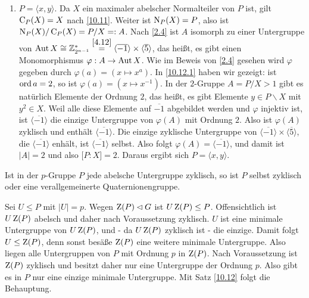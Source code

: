 \begin{beweis}
\begin{enumerate}
\item $P=\langle x, y\rangle$. Da $X$ ein maximaler abelscher Normalteiler von $P$ ist, gilt $\operatorname{C}_P(X)=X$ nach \ref{10.11}. Weiter ist $\operatorname{N}_P(X)=P$, also ist $\operatorname{N}_P(X)/\operatorname{C}_P(X)=P/X=:A$. Nach \ref{2.4} ist $A$ isomorph zu einer Untergruppe von $\operatorname{Aut} X\cong \mathbb{Z}_{2^{n-1}}^*\stackrel{\ref{4.12}}{=}\langle \overline{-1} \rangle\times\langle \overline{5}\rangle$, das hei\ss{}t, es gibt einen Monomorphismus $\varphi:A\to \operatorname{Aut} X$. Wie im Beweis von \ref{2.4} gesehen wird $\varphi$ gegeben durch $\varphi(a)=(x\longmapsto x^a)$. In \ref{10.12.1} haben wir gezeigt: ist $\operatorname{ord} a=2$, so ist $\varphi(a)=(x\longmapsto x^{-1})$. In der $2$-Gruppe $A=P/X>1$ gibt es nat\"urlich Elemente der Ordnung $2$, das hei\ss{}t, es gibt Elemente $y\in P\backslash X$ mit $y^2\in X$. Weil alle diese Elemente auf $\overline{-1}$ abgebildet werden und $\varphi$ injektiv ist, ist $\langle \overline{-1}\rangle$ die einzige Untergruppe von $\varphi(A)$ mit Ordnung $2$. Also ist $\varphi(A)$ zyklisch und enth\"alt $\langle \overline{-1}\rangle$. Die einzige zyklische Untergruppe von $\langle\overline{-1}\rangle\times\langle \overline{5} \rangle$, die $\langle\overline{-1}\rangle$ enh\"alt, ist $\langle \overline{-1}\rangle$ selbst. Also folgt $\varphi(A)=\langle\overline{-1}\rangle$, und damit ist $|A|=2$ und also $\lbrack P:X\rbrack=2$. Daraus ergibt sich $P=\langle x,y\rangle$.
\end{enumerate}

 
\end{beweis}


\begin{folgerung}\label{10.13}
 Ist in der $p$-Gruppe $P$ jede abelsche Untergruppe zyklisch, so ist $P$ selbst zyklisch oder eine verallgemeinerte Quaternionengruppe.
\end{folgerung}
\begin{beweis}
Sei $U\leq P$ mit $|U|=p$. Wegen $\operatorname{Z}(P)\lhd G$ ist $U\operatorname{Z}(P)\leq P$. Offensichtlich ist $U\operatorname{Z}(P)$ abelsch und daher nach Voraussetzung zyklisch. $U$ ist eine minimale Untergruppe von $U\operatorname{Z}(P)$, und - da $U\operatorname{Z}(P)$ zyklisch ist - die einzige. Damit folgt $U\leq \operatorname{Z}(P)$, denn sonst bes\"a\ss{}e $\operatorname{Z}(P)$ eine weitere minimale Untergruppe. Also liegen alle Untergruppen von $P$ mit Ordnung $p$ in $\operatorname{Z}(P)$. Nach Voraussetzung ist $\operatorname{Z}(P)$ zyklisch und besitzt daher nur eine Untergruppe der Ordnung $p$. Also gibt es in $P$ nur eine einzige minimale Untergruppe. Mit Satz \ref{10.12} folgt die Behauptung.
 
\end{beweis}

